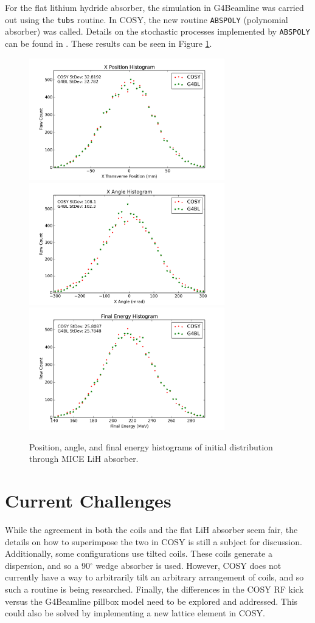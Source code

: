 \documentclass{jacow}
\begin{document}
For the flat lithium hydride absorber, the simulation in G4Beamline was carried out using the \texttt{tubs} routine. In COSY, the new routine \texttt{ABSPOLY} (polynomial absorber) was called. Details on the stochastic processes implemented by \texttt{ABSPOLY} can be found in \cite{ipac2015}. These results can be seen in Figure \ref{fig:mice_coil_absorber}.

\begin{figure}[h!]
\centering
\includegraphics[width=85mm]{Figures/wedge tests (LiH)/xposition.png}
\includegraphics[width=85mm]{Figures/wedge tests (LiH)/xangle.png}
\includegraphics[width=85mm]{Figures/wedge tests (LiH)/energy.png}
\caption{Position, angle, and final energy histograms of initial distribution through MICE LiH absorber.}
\label{fig:mice_coil_absorber}
\end{figure}

\section{Current Challenges}
While the agreement in both the coils and the flat LiH absorber seem fair, the details on how to superimpose the two in COSY is still a subject for discussion. Additionally, some configurations use tilted coils. These coils generate a dispersion, and so a 90$^{\circ}$ wedge absorber is used. However, COSY does not currently have a way to arbitrarily tilt an arbitrary arrangement of coils, and so such a routine is being researched. Finally, the differences in the COSY RF kick versus the G4Beamline pillbox model need to be explored and addressed. This could also be solved by implementing a new lattice element in COSY.

{}

\end{document}
